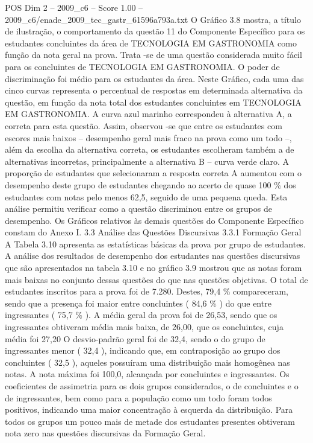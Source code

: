 \begin{textsample}{POS Dim 2 – 2009\_c6 – Score 1.00 – 2009\_c6/enade\_2009\_tec\_gastr\_61596a793a.txt}
O Gráfico 3.8 mostra, a título de ilustração, o comportamento da questão 11 do Componente Específico para os estudantes concluintes da área de TECNOLOGIA EM GASTRONOMIA como função da nota geral na prova.
Trata -se de uma questão considerada muito fácil para os concluintes de TECNOLOGIA EM GASTRONOMIA.
O poder de discriminação foi médio para os estudantes da área.
Neste Gráfico, cada uma das cinco curvas representa o percentual de respostas em determinada alternativa da questão, em função da nota total dos estudantes concluintes em TECNOLOGIA EM GASTRONOMIA.
A curva azul marinho correspondeu à alternativa A, a correta para esta questão.
Assim, observou -se que entre os estudantes com escores mais baixos – desempenho geral mais fraco na prova como um todo –, além da escolha da alternativa correta, os estudantes escolheram também a de alternativas incorretas, principalmente a alternativa B – curva verde claro.
A proporção de estudantes que selecionaram a resposta correta A aumentou com o desempenho deste grupo de estudantes chegando ao acerto de quase 100 \% dos estudantes com notas pelo menos 62,5, seguido de uma pequena queda.
Esta análise permitiu verificar como a questão discriminou entre os grupos de desempenho.
Os Gráficos relativos às demais questões do Componente Específico constam do Anexo I. 3.3 Análise das Questões Discursivas 3.3.1 Formação Geral A Tabela 3.10 apresenta as estatísticas básicas da prova por grupo de estudantes.
A análise dos resultados de desempenho dos estudantes nas questões discursivas que são apresentados na tabela 3.10 e no gráfico 3.9 mostrou que as notas foram mais baixas no conjunto dessas questões do que nas questões objetivas.
O total de estudantes inscritos para a prova foi de 7.280.
Destes, 79,4 \% compareceram, sendo que a presença foi maior entre concluintes ( 84,6 \% ) do que entre ingressantes ( 75,7 \% ).
A média geral da prova foi de 26,53, sendo que os ingressantes obtiveram média mais baixa, de 26,00, que os concluintes, cuja média foi 27,20 O desvio-padrão geral foi de 32,4, sendo o do grupo de ingressantes menor ( 32,4 ), indicando que, em contraposição ao grupo dos concluintes ( 32,5 ), aqueles possuíram uma distribuição mais homogênea nas notas.
A nota máxima foi 100,0, alcançada por concluintes e ingressantes.
Os coeficientes de assimetria para os dois grupos considerados, o de concluintes e o de ingressantes, bem como para a população como um todo foram todos positivos, indicando uma maior concentração à esquerda da distribuição.
Para todos os grupos um pouco mais de metade dos estudantes presentes obtiveram nota zero nas questões discursivas da Formação Geral.

\end{textsample}
